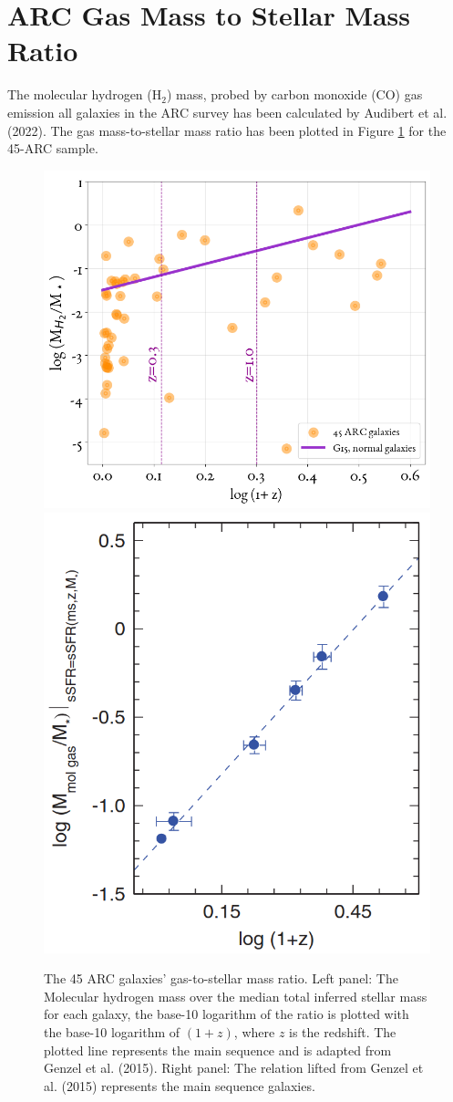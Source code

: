 \section{ARC Gas Mass to Stellar Mass Ratio } 
The molecular hydrogen (H$_2$) mass, probed by carbon monoxide (CO) gas emission all galaxies in the ARC survey has been calculated by Audibert et al. (2022)\cite{Audibert2022}. The gas mass-to-stellar mass ratio has been plotted in Figure \ref{fig:Gas-to-StarMassEvol} for the 45-ARC sample.

\label{sec:Res/ARC_MgasMstar}
\begin{figure}[htbp]
    \centering
    \includegraphics[width=0.64\linewidth]{figures/ResultPlots/GassToStars_median.png}
    \includegraphics[width=0.35\linewidth]{figures/Genzel15.png}
    \caption{ The 45 ARC galaxies' gas-to-stellar mass ratio. Left panel: The Molecular hydrogen mass over the median total inferred stellar mass for each galaxy, the base-10 logarithm of the ratio is plotted with the base-10 logarithm of $(1+z)$, where $z$ is the redshift. The plotted line represents the main sequence and is adapted from Genzel et al. (2015)\cite{Genzel2015}. Right panel: The relation lifted from Genzel et al. (2015)\cite{Genzel2015} represents the main sequence galaxies.}
    \label{fig:Gas-to-StarMassEvol}
\end{figure}

